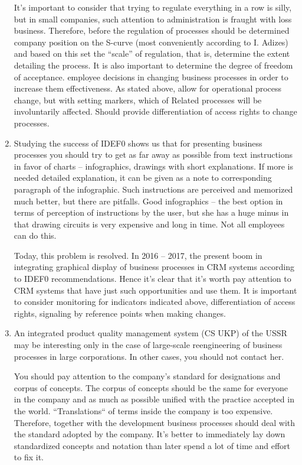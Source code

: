 \documentclass[11pt,a4paper]{book}
\begin{document}
\begin{enumerate}
  It’s important to consider that trying to regulate everything in a row is
  silly, but in small companies, such attention to administration is fraught
  with loss business. Therefore, before the regulation of processes should be
  determined company position on the S-curve (most conveniently according to
  I. Adizes) and based on this set the “scale” of regulation, that is,
  determine the extent detailing the process. It is also important to
  determine the degree of freedom of acceptance.  employee decisions in
  changing business processes in order to increase them effectiveness. As
  stated above, allow for operational process change, but with setting
  markers, which of Related processes will be involuntarily affected. Should
  provide differentiation of access rights to change processes.

\item Studying the success of IDEF0 shows us that for presenting business
  processes you should try to get as far away as possible from text
  instructions in favor of charts -- infographics, drawings with short
  explanations. If more is needed detailed explanation, it can be given as a
  note to corresponding paragraph of the infographic. Such instructions are
  perceived and memorized much better, but there are pitfalls. Good
  infographics -- the best option in terms of perception of instructions by
  the user, but she has a huge minus in that drawing circuits is very
  expensive and long in time. Not all employees can do this.

  Today, this problem is resolved. In 2016 -- 2017, the present boom in
  integrating graphical display of business processes in CRM systems according
  to IDEF0 recommendations. Hence it’s clear that it’s worth pay attention to
  CRM systems that have just such opportunities and use them. It is important
  to consider monitoring for indicators indicated above, differentiation of
  access rights, signaling by reference points when making changes.

\item An integrated product quality management system (CS UKP) of the USSR may
  be interesting only in the case of large-scale reengineering of business
  processes in large corporations. In other cases, you should not contact her.

  You should pay attention to the company’s standard for designations and
  corpus of concepts. The corpus of concepts should be the same for everyone
  in the company and as much as possible unified with the practice accepted in
  the world. “Translations“ of terms inside the company is too expensive.
  Therefore, together with the development business processes should deal with
  the standard adopted by the company.  It’s better to immediately lay down
  standardized concepts and notation than later spend a lot of time and effort
  to fix it.


\end{enumerate}
\end{document}
